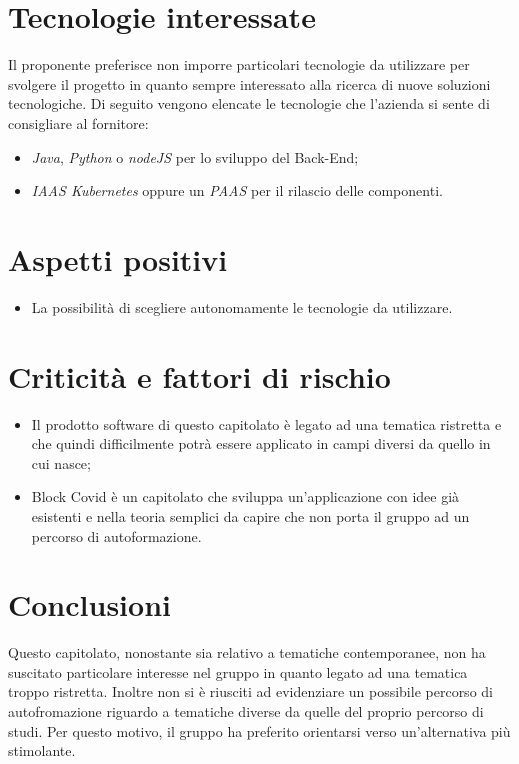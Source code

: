 \section{Tecnologie interessate}
Il proponente preferisce non imporre particolari tecnologie da utilizzare per svolgere il progetto in quanto sempre interessato alla ricerca di nuove soluzioni tecnologiche. Di seguito vengono elencate le tecnologie che l'azienda si sente di consigliare al fornitore:
\begin{itemize}
	\item \textit{Java}, \textit{Python} o \textit{nodeJS} per lo sviluppo del Back-End;
	\item \textit{IAAS Kubernetes} oppure un \textit{PAAS} per il rilascio delle componenti.
\end{itemize}
\section{Aspetti positivi}
\begin{itemize}
	\item La possibilità di scegliere autonomamente le tecnologie da utilizzare.
\end{itemize}
\section{Criticità e fattori di rischio}
\begin{itemize}
	\item Il prodotto software di questo capitolato è legato ad una tematica ristretta e che quindi difficilmente potrà essere applicato in campi diversi da quello in cui nasce;
	\item Block Covid è un capitolato che sviluppa un'applicazione con idee già esistenti e nella teoria semplici da capire che non porta il gruppo ad un percorso di autoformazione.
\end{itemize}
\section{Conclusioni}
Questo capitolato, nonostante sia relativo a tematiche contemporanee, non ha suscitato particolare interesse nel gruppo in quanto legato ad una tematica troppo ristretta. Inoltre non si è riusciti ad evidenziare un possibile percorso di autofromazione riguardo a tematiche diverse da quelle del proprio percorso di studi. Per questo motivo, il gruppo ha preferito orientarsi verso un'alternativa più stimolante.